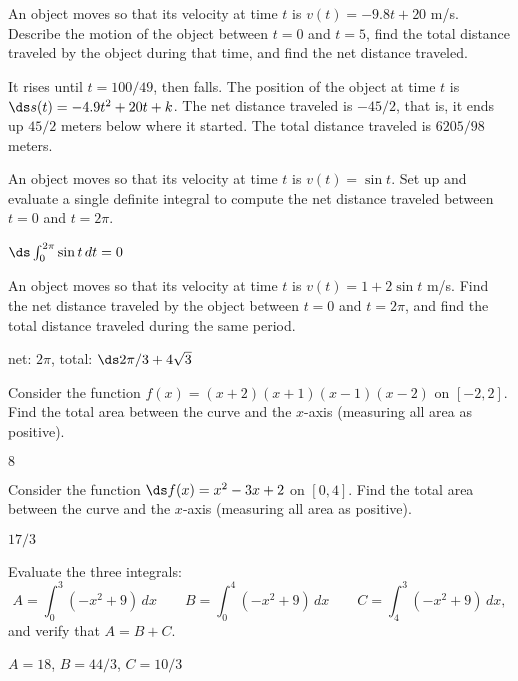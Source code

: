 \begin{exercises}

\begin{exercise} An object moves so that its velocity at time $t$ is
$v(t)=-9.8t+20$ m/s. Describe the motion of the object between $t=0$ and
$t=5$, find the total distance traveled by the object during that
time, and find the net distance traveled.
\begin{answer} It rises until $t=100/49$, then falls. The position of the
object at time $t$ is $\ds s(t)=-4.9t^2+20t+k$. The net distance traveled
is $-45/2$, that is, it ends up $45/2$ meters below where it started.
The total distance traveled is $6205/98$ meters. 
\end{answer}\end{exercise}

\begin{exercise} An object moves so that its velocity at time $t$ is $v(t)=\sin t$.
Set up and evaluate a single definite integral to compute the
net distance traveled between $t=0$ and $t=2\pi$.
\begin{answer} $\ds\int_0^{2\pi}\sin t\,dt=0$
\end{answer}\end{exercise}

\begin{exercise} An object moves so that its velocity at time $t$ is
$v(t)=1+2\sin t$ m/s. Find the net distance traveled by the object
between $t=0$ and $t=2\pi$, and find the total distance traveled
during the same period.
\begin{answer} net: $2\pi$, total: $\ds 2\pi/3+4\sqrt3$ 
\end{answer}\end{exercise}

\begin{exercise} Consider the function $f(x)=(x+2)(x+1)(x-1)(x-2)$ on
$[-2,2]$. Find the total area between the curve and the $x$-axis
(measuring all area as positive).
\begin{answer} $8$
\end{answer}\end{exercise}

\begin{exercise} Consider the function $\ds f(x)=x^2-3x+2$ on
$[0,4]$. Find the total area between the curve and the $x$-axis
(measuring all area as positive).
\begin{answer} $17/3$
\end{answer}\end{exercise}

\begin{exercise} Evaluate the three integrals:
$$
  A=\int_0^3 (-x^2+9)\,dx\qquad B=\int_0^{4} (-x^2+9)\,dx\qquad 
  C=\int_{4}^3 (-x^2+9)\,dx,
$$
and verify that $A=B+C$.
\begin{answer} $A=18$, $B=44/3$, $C=10/3$
\end{answer}\end{exercise}

\end{exercises}

